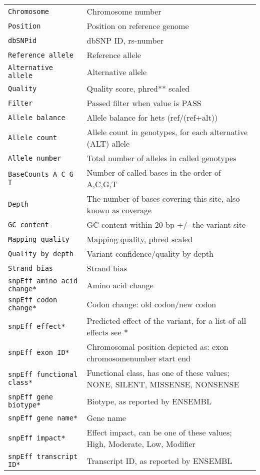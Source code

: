 \documentclass[a4paper,12pt]{article}
\begin{document}
\begin{center}
\begin{longtable}{p{5cm} p{8cm}}
	\tt{Chromosome} & Chromosome number \\
	\tt{Position} & Position on reference genome \\
	\tt{dbSNPid} & dbSNP ID, rs-number \\
	\tt{Reference allele} & Reference allele \\
	\tt{Alternative allele} & Alternative allele \\
	\tt{Quality} & Quality score, phred** scaled \\
	\tt{Filter} & Passed filter when value is PASS \\
	\tt{Allele balance} & Allele balance for hets (ref/(ref+alt)) \\
	\tt{Allele count} & Allele count in genotypes, for each alternative (ALT) allele \\
	\tt{Allele number} & Total number of alleles in called genotypes \\
	\tt{BaseCounts A C G T} & Number of called bases in the order of A,C,G,T \\
	\tt{Depth} & The number of bases covering this site, also known as coverage \\
	\tt{GC content} & GC content within 20 bp +/- the variant site \\
	\tt{Mapping quality} & Mapping quality, phred scaled \\
	\tt{Quality by depth} & Variant confidence/quality by depth \\
	\tt{Strand bias} & Strand bias \\
	\tt{snpEff amino acid change*} & Amino acid change \\
	\tt{snpEff codon change*} & Codon change: old codon/new codon \\
	\tt{snpEff effect*} & Predicted effect of the variant, for a list of all effects see * \\
	\tt{snpEff exon ID*} & Chromosomal position depicted as: exon chromosomenumber start end \\
	\tt{snpEff functional class*} & Functional class, has one of these values; NONE, SILENT, MISSENSE, NONSENSE \\
	\tt{snpEff gene biotype*} & Biotype, as reported by ENSEMBL \\
	\tt{snpEff gene name*} & Gene name \\
	\tt{snpEff impact*} & Effect impact, can be one of these values; High, Moderate, Low, Modifier \\
	\tt{snpEff transcript ID*} & Transcript ID, as reported by ENSEMBL \\

\end{longtable}
\end{center}
\end{document}
